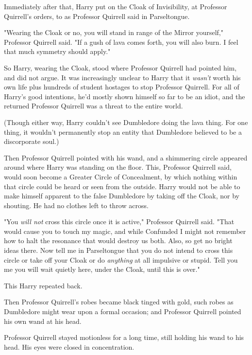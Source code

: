 Immediately after that, Harry put on the Cloak of Invisibility, at Professor 
Quirrell's orders, to  as Professor Quirrell said in Parseltongue.

"Wearing the Cloak or no, you will stand in range of the Mirror yourself," 
Professor Quirrell said. "If a gush of lava comes forth, you will also burn. I 
feel that much symmetry should apply."

So Harry, wearing the Cloak, stood where Professor Quirrell had pointed him, 
and did not argue. It was increasingly unclear to Harry that it \emph{wasn't} 
worth his own life plus hundreds of student hostages to stop Professor 
Quirrell. For all of Harry's good intentions, he'd mostly shown himself so far 
to be an idiot, and the returned Professor Quirrell was a threat to the entire 
world.

(Though either way, Harry couldn't see Dumbledore doing the lava thing. For one 
thing, it wouldn't permanently stop an entity that Dumbledore believed to be a 
discorporate soul.)

Then Professor Quirrell pointed with his wand, and a shimmering circle appeared 
around where Harry was standing on the floor. This, Professor Quirrell said, 
would soon become a Greater Circle of Concealment, by which nothing within that 
circle could be heard or seen from the outside. Harry would not be able to make 
himself apparent to the false Dumbledore by taking off the Cloak, nor by 
shouting. He had no clothes left to throw across.

"You \emph{will not} cross this circle once it is active," Professor Quirrell 
said. "That would cause you to touch my magic, and while Confunded I might not 
remember how to halt the resonance that would destroy us both. Also, 
 so get no bright ideas there. Now tell me in Parseltongue that you do 
not intend to cross this circle or take off your Cloak or do \emph{anything} at 
all impulsive or stupid. Tell you me you will wait quietly here, under the 
Cloak, until this is over."

This Harry repeated back.

Then Professor Quirrell's robes became black tinged with gold, such robes as 
Dumbledore might wear upon a formal occasion; and Professor Quirrell pointed 
his own wand at his head.

Professor Quirrell stayed motionless for a long time, still holding his wand to 
his head. His eyes were closed in concentration.

